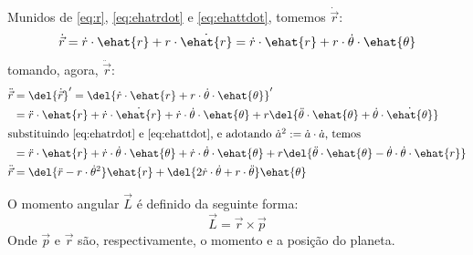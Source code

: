 \documentclass[]{IMTexam}
\begin{document}
\begin{questions}
\begin{parts}
		\begin{solution}
			Munidos de \ref{eq:r}, \ref{eq:ehatrdot} e \ref{eq:ehattdot}, tomemos $ \dot{\vec{r}} $:
			\begin{equation}\label{eq:dotr}
				\dot{\vec{r}}=\dot{r}\cdot\ehat{r}+r\cdot\dot{\ehat{r}}=\dot{r}\cdot\ehat{r}+r\cdot\dot{\theta}\cdot\ehat{\theta}
			\end{equation}
			tomando, agora, $ \ddot{\vec{r}} $:
			\begin{align}
				\ddot{\vec{r}} & =\del{\dot{\vec{r}}}'=\del{\dot{r}\cdot\ehat{r}+r\cdot\dot{\theta}\cdot\ehat{\theta}}'\nonumber                                                                                                         \\
				               & =\ddot{r}\cdot\ehat{r}+\dot{r}\cdot\dot{\ehat{r}}+\dot{r}\cdot\dot{\theta}\cdot\ehat{\theta}+r\del{\ddot{\theta}\cdot\ehat{\theta}+\dot{\theta}\cdot\dot{\ehat{\theta}}}\nonumber                       \\
				\intertext{substituindo \ref{eq:ehatrdot} e \ref{eq:ehattdot}, e adotando $ \dot{a}^{2}:=\dot{a}\cdot\dot{a} $, temos}
				               & =\ddot{r}\cdot\ehat{r}+\dot{r}\cdot\dot{\theta}\cdot\ehat{\theta}+\dot{r}\cdot\dot{\theta}\cdot\ehat{\theta}+r\del{\ddot{\theta}\cdot\ehat{\theta}-\dot{\theta}\cdot\dot{\theta}\cdot\ehat{r}}\nonumber \\
				\ddot{\vec{r}} & =\del{\ddot{r}-r\cdot\dot{\theta}^{2}}\ehat{r}+\del{2\dot{r}\cdot\dot{\theta}+r\cdot\ddot{\theta}}\ehat{\theta}\label{eq:ddotr}
			\end{align}
		\end{solution}
	\end{parts}

	\medskip

	\question \label{ques:q2} O momento angular $\vec{L}$ é definido da seguinte forma:
	\begin{equation}\label{eq:angMommentum}
		\vec{L}=\vec{r}\times\vec{p}
	\end{equation}
	Onde $\vec{p}$ e $\vec{r}$ são, respectivamente, o momento e a posição do planeta.

\end{questions}
\end{document}
